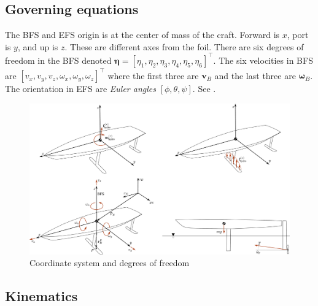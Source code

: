 \documentclass[10pt]{article}
\newcommand{\mbf}[1]{\mathbf{#1}}
\begin{document}
\subsection{Governing equations}
% 
The BFS and EFS origin is at the center of mass of the craft.
Forward is $x$, port is $y$, and up is $z$.
These are different axes from the foil.
There are six degrees of freedom in the BFS denoted $\boldsymbol{\eta} = [\eta_1,\eta_2,\eta_3,\eta_4,\eta_5,\eta_6]^{\top}$.
The six velocities in BFS are $[v_x,v_y,v_z,\omega_x,\omega_y,\omega_z]^{\top}$ where the first three are $\mbf{v}_B$ and the last three are $\boldsymbol{\omega}_B$.
The orientation in EFS are \emph{Euler angles} $[\phi, \theta, \psi]$.
See .
\begin{figure}[htb!]
    \centering
    \includegraphics[width=0.6\linewidth,clip,trim={0cm 0cm 37cm 20cm}]{SeakeepingDiagram.pdf}
    \caption{\label{fig:Coordinates}Coordinate system and degrees of freedom}
\end{figure}
\subsection{Kinematics}
\end{document}
